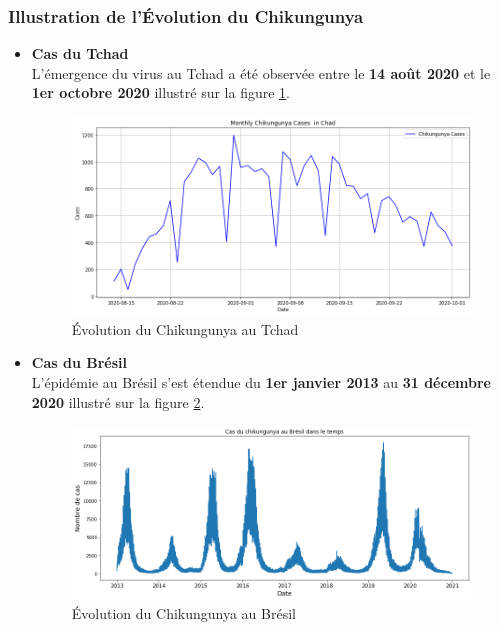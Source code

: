 \subsubsection*{Illustration de l'Évolution du Chikungunya}
\begin{itemize}
	\item \textbf{Cas du Tchad}\\
	L'émergence du virus au Tchad a été observée entre le \textbf{14 août 2020} et le \textbf{1er octobre 2020} illustré sur la figure \ref{fig:casechad}.
	\begin{figure}[h!]
		\centering
		\includegraphics[width=0.9\linewidth]{images/case_chad}
		\caption[Évolution du Chikungunya au Tchad]{Évolution du Chikungunya au Tchad}
		\label{fig:casechad}
	\end{figure}
	
	\item \textbf{Cas du Brésil}\\
	L'épidémie au Brésil s'est étendue du \textbf{1er janvier 2013} au \textbf{31 décembre 2020} illustré sur la figure \ref{fig:casebrazil}.
	\begin{figure}[h!]
		\centering
		\includegraphics[width=0.9\linewidth]{images/cas_bresil}
		\caption[Évolution du Chikungunya au Brésil]{Évolution du Chikungunya au Brésil}
		\label{fig:casebrazil}
	\end{figure}
	

\end{itemize}
